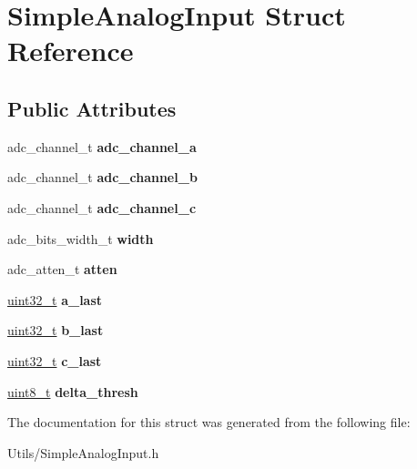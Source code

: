 \hypertarget{structSimpleAnalogInput}{}\section{Simple\+Analog\+Input Struct Reference}
\label{structSimpleAnalogInput}
\subsection*{Public Attributes}
\begin{DoxyCompactItemize}
\item 
\mbox{\label{structSimpleAnalogInput_ab4596b9b21f9cd89606fac1102ed249f}} 
adc\+\_\+channel\+\_\+t {\bfseries adc\+\_\+channel\+\_\+a}
\item 
\mbox{\label{structSimpleAnalogInput_a864f945ccc8f2ad67753a5e728d4b1f8}} 
adc\+\_\+channel\+\_\+t {\bfseries adc\+\_\+channel\+\_\+b}
\item 
\mbox{\label{structSimpleAnalogInput_ae9e7e8d6db10cdb900d198681874b665}} 
adc\+\_\+channel\+\_\+t {\bfseries adc\+\_\+channel\+\_\+c}
\item 
\mbox{\label{structSimpleAnalogInput_a2895a4b62f46018b80cfa6aaf8672f91}} 
adc\+\_\+bits\+\_\+width\+\_\+t {\bfseries width}
\item 
\mbox{\label{structSimpleAnalogInput_a16601666577f31df97d9f6ebfcdd8871}} 
adc\+\_\+atten\+\_\+t {\bfseries atten}
\item 
\mbox{\label{structSimpleAnalogInput_adb0d4af6d29346a005e4ac8daaf57ec0}} 
\hyperlink{vl53l0x__types_8h_a435d1572bf3f880d55459d9805097f62}{uint32\+\_\+t} {\bfseries a\+\_\+last}
\item 
\mbox{\label{structSimpleAnalogInput_ad707ed320a834b76c95f090a56ac322b}} 
\hyperlink{vl53l0x__types_8h_a435d1572bf3f880d55459d9805097f62}{uint32\+\_\+t} {\bfseries b\+\_\+last}
\item 
\mbox{\label{structSimpleAnalogInput_a543707372dbec10860d913c118a6c031}} 
\hyperlink{vl53l0x__types_8h_a435d1572bf3f880d55459d9805097f62}{uint32\+\_\+t} {\bfseries c\+\_\+last}
\item 
\mbox{\label{structSimpleAnalogInput_a25bc1785a9847620bf8e6802c07913f4}} 
\hyperlink{vl53l0x__types_8h_aba7bc1797add20fe3efdf37ced1182c5}{uint8\+\_\+t} {\bfseries delta\+\_\+thresh}
\end{DoxyCompactItemize}


The documentation for this struct was generated from the following file\+:\begin{DoxyCompactItemize}
\item 
Utils/Simple\+Analog\+Input.\+h\end{DoxyCompactItemize}
